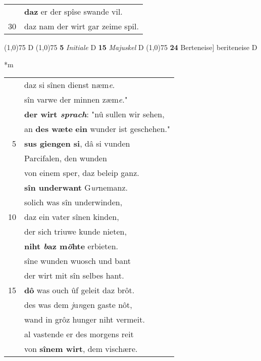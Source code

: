 \documentclass[8pt,a4paper,notitlepage]{article}
\begin{document}
\begin{table}[ht]
\begin{minipage}[t]{0.5\linewidth}
\begin{tabular}{rl}
 & \textbf{daz} er der spîse swande vil.\\ 
30 & daz nam der wirt gar zeime spil.\\ 
\end{tabular}
\scriptsize
\line(1,0){75} \newline
D \newline
\line(1,0){75} \newline
\textbf{5} \textit{Initiale} D  \textbf{15} \textit{Majuskel} D  \newline
\line(1,0){75} \newline
\textbf{24} Berteneise] beriteneise D \newline
\end{minipage}
\hspace{0.5cm}
\begin{minipage}[t]{0.5\linewidth}
\small
\begin{center}*m
\end{center}
\begin{tabular}{rl}
 & daz si sînen dienst næm\textit{e}.\\ 
 & sîn varwe der minnen zæm\textit{e}."\\ 
 & \textbf{der wirt \textit{sprach}}: "nû sullen wir sehen,\\ 
 & an \textbf{des wæte} \textbf{ein} wunder ist geschehen."\\ 
5 & \textbf{sus giengen si}, dâ si vunden\\ 
 & Parcifalen, den wunden\\ 
 & von einem sper, daz beleip ganz.\\ 
 & \textbf{sîn underwant}  G\textit{ur}nemanz.\\ 
 & solich was sîn underwinden,\\ 
10 & daz ein vater sînen kinden,\\ 
 & der sich triuwe kunde nieten,\\ 
 & \textbf{niht \textit{b}az m\textit{ö}hte} erbieten.\\ 
 & sîne wunden wuosch und bant\\ 
 & der wirt mit sîn selbes hant.\\ 
15 & \textbf{dô} was ouch ûf geleit daz brôt.\\ 
 & des was dem \textit{j}u\textit{n}gen gaste nôt,\\ 
 & wand in grôz hunger niht vermeit.\\ 
 & al vastende er des morgens reit\\ 
 & von \textbf{sînem wirt}, dem vischære.\\ 

\end{tabular}
\end{minipage}
\end{table}
\end{document}
